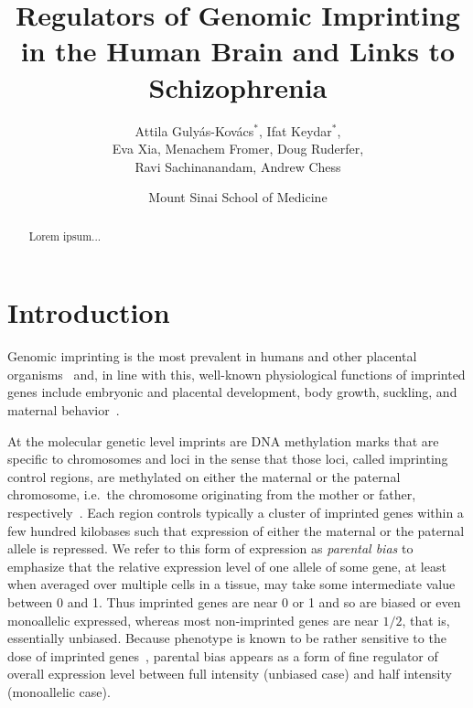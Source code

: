 \documentclass[letterpaper]{article}
\title{Regulators of Genomic Imprinting in the Human Brain and Links to Schizophrenia}
\author{Attila Guly\'{a}s-Kov\'{a}cs\(^\ast\), Ifat Keydar\(^\ast\),\\
Eva Xia, Menachem Fromer, Doug Ruderfer,\\
Ravi Sachinanandam, Andrew Chess}
\date{Mount Sinai School of Medicine}
\begin{document}
\maketitle

\newpage

\maketitle

\begin{abstract}
Lorem ipsum...
\end{abstract}

\section{Introduction}

Genomic imprinting is the most prevalent in humans and other placental
organisms~\cite{Renfree2012} and, in line with this, well-known physiological
functions of imprinted genes include embryonic and placental development, body
growth, suckling, and maternal behavior~\cite{Plasschaert2014,Peters2014}.

At the molecular genetic level imprints are DNA methylation marks that are
specific to chromosomes and loci in the sense that those loci, called
imprinting control regions, are methylated on either the maternal or the
paternal chromosome, i.e.~the chromosome originating from the mother or
father, respectively~\cite{Plasschaert2014}.  Each region controls typically a
cluster of imprinted genes within a few hundred kilobases such that expression
of either the maternal or the paternal allele is repressed.  We refer to this
form of expression as \emph{parental bias} to emphasize that the relative
expression level of one allele of some gene, at least when averaged over
multiple cells in a tissue, may take some intermediate value between 0 and 1.
Thus imprinted genes are near 0 or 1 and so are biased or even monoallelic
expressed, whereas most non-imprinted genes are near \(1/2\), that is,
essentially unbiased.  Because phenotype is known to be rather sensitive to
the dose of imprinted genes~\cite{McNamara2013}, parental bias appears as a
form of fine regulator of overall expression level between full intensity
(unbiased case) and half intensity (monoallelic case).
\end{document}
